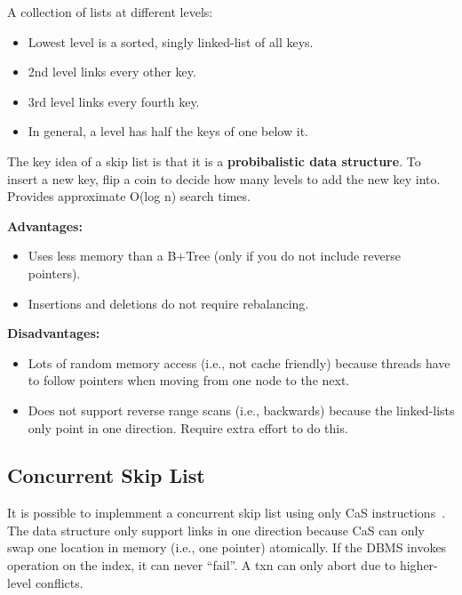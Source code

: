 \documentclass[11pt]{article}
\begin{document}
A collection of lists at different levels:
\begin{itemize}
    \item
    Lowest level is a sorted, singly linked-list of all keys.
    
    \item
    2nd level links every other key.
    
    \item
    3rd level links every fourth key.
    
    \item
    In general, a level has half the keys of one below it.
\end{itemize}
    
The key idea of a skip list is that it is a \textbf{probibalistic data structure}. To insert a new 
key, flip a coin to decide how many levels to add the new key into. 
Provides approximate O(log n) search times.

\textbf{Advantages:}
\begin{itemize}
    \item
    Uses less memory than a B+Tree (only if you do not include reverse pointers).
    
    \item
    Insertions and deletions do not require rebalancing.
\end{itemize}

\textbf{Disadvantages:}
\begin{itemize}
    \item
    Lots of random memory access (i.e., not cache friendly) because threads have to follow pointers 
    when moving from one node to the next.
    
    \item
    Does not support reverse range scans (i.e., backwards) because the linked-lists only point in 
    one direction. Require extra effort to do this.
\end{itemize}

\subsection*{Concurrent Skip List}
It is possible to implemment a concurrent skip list using only CaS 
instructions~\cite{hpugh-concurrent-tr1990}. The data structure only support links in one direction 
because CaS can only swap one location in memory (i.e., one pointer) atomically.
If the DBMS invokes operation on the index, it can never ``fail''. A txn can only abort due to 
higher-level conflicts.
\end{document}
